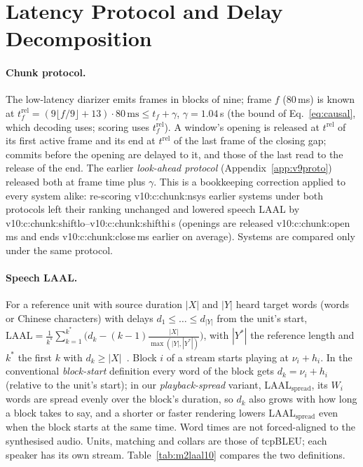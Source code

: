 \section{Latency Protocol and Delay Decomposition}
\label{app:chunk}

\paragraph{Chunk protocol.} The low-latency diarizer emits frames in blocks of nine; frame $f$ (80\,ms) is known at
$t^{\mathrm{rel}}_f=(9\lfloor f/9\rfloor+13)\cdot 80\,\text{ms}\le t_f+\gamma$, $\gamma=1.04$\,s (the bound of
Eq.~\eqref{eq:causal}, which decoding uses; scoring uses $t^{\mathrm{rel}}_f$). A window's opening is released at
$t^{\mathrm{rel}}$ of its first active frame and its end at $t^{\mathrm{rel}}$ of the last frame of the closing gap;
commits before the opening are delayed to it, and those of the last read to the release of the end. The earlier
\emph{look-ahead protocol} (Appendix~\ref{app:v9proto}) released both at frame time plus $\gamma$. This is a bookkeeping correction applied to every system alike: re-scoring \num{v10:c:chunk:nsys} earlier
systems under both protocols left their ranking unchanged and lowered speech LAAL by
\num{v10:c:chunk:shiftlo}--\num{v10:c:chunk:shifthi}\,s (openings are released \num{v10:c:chunk:open}\,ms and ends
\num{v10:c:chunk:close}\,ms earlier on average). Systems are compared only under the same protocol.

\paragraph{Speech LAAL.} For a reference unit with source duration $|X|$ and $|Y|$ heard target words (words or Chinese
characters) with delays $d_1\le\dots\le d_{|Y|}$ from the unit's start, $\mathrm{LAAL}=\frac{1}{k^\ast}\sum_{k=1}^{k^\ast}
\big(d_k-(k-1)\frac{|X|}{\max(|Y|,|Y^\ast|)}\big)$, with $|Y^\ast|$ the reference length and $k^\ast$ the first $k$ with
$d_k\ge|X|$~\citep{papi2022over}. Block $i$ of a stream starts playing at $\nu_i+h_i$. In the conventional
\emph{block-start} definition every word of the block gets $d_k=\nu_i+h_i$ (relative to the unit's start); in our
\emph{playback-spread} variant, LAAL$_\text{spread}$, its $W_i$ words are spread evenly over the block's duration, so
$d_k$ also grows with how long a block takes to say, and a shorter or faster rendering lowers LAAL$_\text{spread}$ even
when the block starts at the same time. Word times are not forced-aligned to the synthesised audio. Units, matching and
collars are those of tcpBLEU; each speaker has its own stream. Table~\ref{tab:m2laal10} compares the two definitions.

